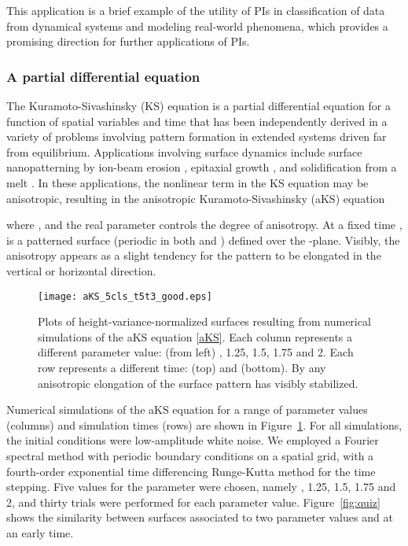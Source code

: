\documentclass[11pt]{article}
\begin{document}
This application is a brief example of the utility of PIs in classification of data from dynamical systems and modeling real-world phenomena, which provides a promising direction for further applications of PIs.

\subsubsection{A partial differential equation} \label{sec:aks}

The Kuramoto-Sivashinsky (KS) equation is a partial differential equation for a function  of spatial variables  and time  that has been independently derived in a variety of problems involving pattern formation in extended systems driven far from equilibrium.  Applications involving surface dynamics include surface nanopatterning by ion-beam erosion \citep{cb95,Motta12}, epitaxial growth \citep{villain91,wolf91,rost95}, and solidification from a melt \citep{golovin98}.  In these applications, the nonlinear term in the KS equation may be anisotropic, resulting in the anisotropic Kuramoto-Sivashinsky (aKS) equation

where , and the real parameter  controls the degree of anisotropy.  At a fixed time ,  is a patterned surface (periodic in both  and ) defined over the -plane. Visibly, the anisotropy appears as a slight tendency for the pattern to be elongated in the vertical or horizontal direction.      

\begin{figure}[h!]
\centering
\texttt{[image: aKS\_5cls\_t5t3\_good.eps]}
\caption{Plots of height-variance-normalized surfaces  resulting from numerical simulations of the aKS equation \eqref{aKS}.  Each column represents a different parameter value: (from left) , 1.25, 1.5, 1.75 and 2. Each row represents a different time:  (top) and  (bottom). By  any anisotropic elongation of the surface pattern has visibly stabilized.}
\label{fig:aks-ex}
\end{figure}

Numerical simulations of the aKS equation for a range of parameter values (columns) and simulation times (rows) are shown in Figure~\ref{fig:aks-ex}.  For all simulations, the initial conditions were low-amplitude white noise.  We employed a Fourier spectral method with periodic boundary conditions on a  spatial grid, with a fourth-order exponential time differencing Runge-Kutta method for the time stepping. Five values for the parameter  were chosen, namely , 1.25, 1.5, 1.75 and 2, and thirty trials were performed for each parameter value. Figure~\ref{fig:quiz} shows the similarity between surfaces associated to two parameter values  and  at an early time.
\end{document}
